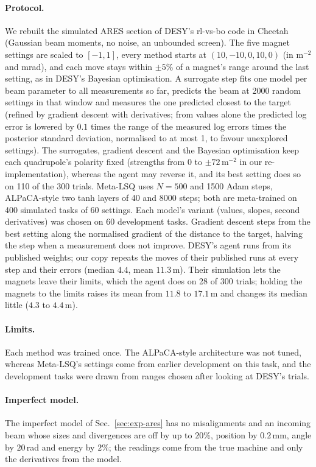 \documentclass[fullpaper,final]{nldl}
\theoremstyle{plain}
\theoremstyle{definition}
\begin{document}
\paragraph{Protocol.} We rebuilt the simulated ARES section of DESY's rl-vs-bo code
in Cheetah (Gaussian beam moments, no noise, an unbounded screen). The five magnet
settings are scaled to $[-1,1]$, every method starts at $(10,-10,0,10,0)$ (in m$^{-2}$ and mrad), and each
move stays within $\pm5\%$ of a magnet's range around the last setting, as in
DESY's Bayesian optimisation. A surrogate step fits one model per beam parameter to
all measurements so far, predicts the beam at 2000 random settings in that window
and measures the one predicted closest to the target (refined by gradient descent
with derivatives; from values alone the predicted log error is lowered by $0.1$
times the range of the measured log errors times the posterior standard deviation,
normalised to at most 1, to favour unexplored settings). The surrogates, gradient descent and the Bayesian
optimisation keep each quadrupole's polarity fixed (strengths from $0$ to $\pm72$\,m$^{-2}$
in our re-implementation), whereas the agent may reverse it, and its best setting
does so on 110 of the 300 trials. Meta-LSQ uses $N{=}500$ and 1500 Adam steps, ALPaCA-style two tanh
layers of 40 and 8000 steps; both are meta-trained on 400 simulated tasks of 60
settings. Each model's variant (values, slopes, second derivatives) was chosen on 60
development tasks. Gradient descent steps from the best setting along the
normalised gradient of the distance to the target, halving the step when a
measurement does not improve. DESY's agent runs from its published weights; our copy
repeats the moves of their published runs at every step and their errors (median
$4.4$, mean $11.3$\,\textmu m). Their simulation lets the magnets leave their limits,
which the agent does on 28 of 300 trials; holding the magnets to the limits raises
its mean from $11.8$ to $17.1$\,\textmu m and changes its median little ($4.3$ to
$4.4$\,\textmu m).

\paragraph{Limits.} Each method was trained once. The ALPaCA-style architecture was
not tuned, whereas Meta-LSQ's settings come from earlier development on this task,
and the development tasks were drawn from ranges chosen after looking at DESY's
trials.

\paragraph{Imperfect model.} The imperfect model of Sec.~\ref{sec:exp-ares} has no
misalignments and an incoming beam whose sizes and divergences are off by up to
$20\%$, position by $0.2$\,mm, angle by $20$\,\textmu rad and energy by $2\%$; the
readings come from the true machine and only the derivatives from the model.
\end{document}
